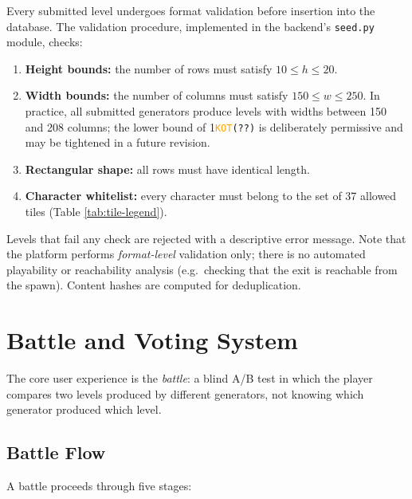 \documentclass[shortabstract, mgr, english]{iithesis}
\newcommand{\DEBUG}[1]{{#1}} %
\newcommand{\KOT}[1]{\DEBUG{\tt{\textcolor{orange}{KOT}(}{#1}{)}}}
\begin{document}
Every submitted level undergoes format validation before insertion into the database. The
validation procedure, implemented in the backend's \texttt{seed.py} module, checks:

\begin{enumerate}
    \item \textbf{Height bounds:} the number of rows must satisfy
          $10 \leq h \leq 20$.
    \item \textbf{Width bounds:} the number of columns must satisfy
          $150 \leq w \leq 250$.  In practice, all submitted generators produce levels
          with widths between 150 and 208 columns; the lower bound of 1\KOT{??} is deliberately
          permissive and may be tightened in a future revision.
    \item \textbf{Rectangular shape:} all rows must have identical length.
    \item \textbf{Character whitelist:} every character must belong to the set of
          37 allowed tiles (Table \ref{tab:tile-legend}).
\end{enumerate}

Levels that fail any check are rejected with a descriptive error message. Note that the
platform performs \emph{format-level} validation only; there is no automated playability
or reachability analysis (e.g.\ checking that the exit is reachable from the spawn).
Content hashes are computed for deduplication.

\section{Battle and Voting System}
\label{sec:sd-battle}

The core user experience is the \emph{battle}: a blind A/B test in which the player
compares two levels produced by different generators, not knowing which generator
produced which level.

\subsection{Battle Flow}
\label{subsec:sd-battle-flow}

A battle proceeds through five stages:
\end{document}
